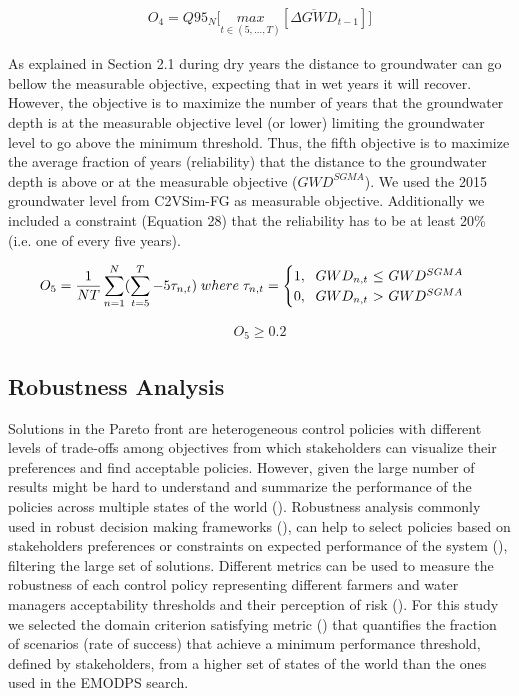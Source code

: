 \documentclass[11pt,a4paper]{article}
\begin{document}
\begin{align}
O_{4} = Q95_{N} \bigg[\underset{t\in(5,...,T)}{max}[\overline{\Delta GWD}_{t-1}]\bigg]
\end{align}

As explained in Section 2.1 during dry years the distance to groundwater can go bellow the measurable objective, expecting that in wet years it will recover. However, the objective is to maximize the number of years that the groundwater depth is at the measurable objective level (or lower) limiting the groundwater level to go above the minimum threshold. Thus, the fifth objective is to maximize the average fraction of years (reliability) that the distance to the groundwater depth is above or at the measurable objective ($GWD^{SGMA}$).  We used the 2015 groundwater level from C2VSim-FG as measurable objective. Additionally we included a constraint (Equation 28) that the reliability has to be at least 20\% (i.e. one of every five years). 

\begin{align}
O_{5} = \frac{1}{NT}\sum_{n=1}^N(\sum_{t=5}^T-5 \tau_{n,t})\; where\; \tau_{n,t} = \begin{cases}
      1, \text{\; $GWD_{n,t}$  $\leq$ $GWD^{SGMA}$}\\
      0, \text{\; $GWD_{n,t}$ $>$ $GWD^{SGMA}$}\\
\end{cases}      
\end{align}


\begin{align}
O_{5} \geq 0.2
\end{align}

\subsection{Robustness Analysis}

Solutions in the Pareto front are heterogeneous control policies with different levels of trade-offs among objectives from which stakeholders can visualize their preferences and find acceptable policies. However, given the large number of results might be hard to understand and summarize the performance of the policies across multiple states of the world (\cite{herman_how_2015}). Robustness analysis commonly used in robust decision making frameworks (\cite{marchau_decision_2019}), can help to select policies based on stakeholders preferences or constraints on expected performance of the system (\cite{kasprzyk_many_2013}), filtering the large set of solutions. Different metrics can be used to measure the robustness of each control policy representing different farmers and water managers acceptability thresholds and their perception of risk (\cite{mcphail_robustness_2018}). For this study we selected the domain criterion satisfying metric (\cite{schneller_decision_1983}) that quantifies the fraction of scenarios (rate of success) that achieve a minimum performance threshold, defined by stakeholders, from a higher set of states of the world than the ones used in the EMODPS search. 
\end{document}
